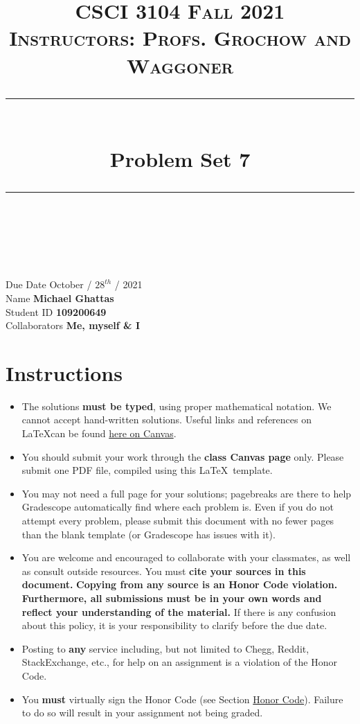 \documentclass[11pt]{article}
\title{
\normalfont \normalsize 
\textsc{CSCI 3104 Fall 2021 \\ 
Instructors: Profs. Grochow and Waggoner} \\
[10pt] 
\rule{\linewidth}{0.5pt} \\[6pt] 
\huge Problem Set 7 \\
\rule{\linewidth}{2pt}  \\[10pt]
}
\date{}
\theoremstyle{definition}
\theoremstyle{definition}
\theoremstyle{definition}
\begin{document}
\maketitle


\noindent
Due Date \dotfill October / $28^{th}$ / 2021 \\
Name \dotfill \textbf{Michael Ghattas} \\
Student ID \dotfill \textbf{109200649} \\
Collaborators \dotfill \textbf{Me, myself \& I}

\tableofcontents

\section*{Instructions}
 \begin{itemize}
	\item The solutions \textbf{must be typed}, using proper mathematical notation. We cannot accept hand-written solutions. Useful links and references on \LaTeX can be found \href{https://canvas.colorado.edu/courses/75824/pages/latex}{here on Canvas}.
	\item You should submit your work through the \textbf{class Canvas page} only. Please submit one PDF file, compiled using this \LaTeX \ template.
	\item You may not need a full page for your solutions; pagebreaks are there to help Gradescope automatically find where each problem is. Even if you do not attempt every problem, please submit this document with no fewer pages than the blank template (or Gradescope has issues with it).

	\item You are welcome and encouraged to collaborate with your classmates, as well as consult outside resources. You must \textbf{cite your sources in this document.} \textbf{Copying from any source is an Honor Code violation. Furthermore, all submissions must be in your own words and reflect your understanding of the material.} If there is any confusion about this policy, it is your responsibility to clarify before the due date. 

	\item Posting to \textbf{any} service including, but not limited to Chegg, Reddit, StackExchange, etc., for help on an assignment is a violation of the Honor Code.

	\item You \textbf{must} virtually sign the Honor Code (see Section \hyperlink{HonorCode}{Honor Code}). Failure to do so will result in your assignment not being graded.
\end{itemize}
\end{document}
